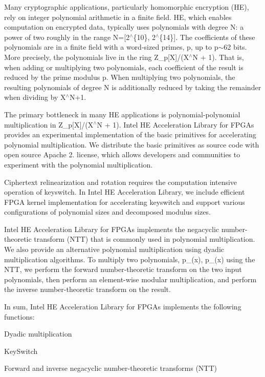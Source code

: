 Many cryptographic applications, particularly homomorphic encryption (H\-E), rely on integer polynomial arithmetic in a finite field. H\-E, which enables computation on encrypted data, typically uses polynomials with degree {\ttfamily N\-:} a power of two roughly in the range {\ttfamily N=\mbox{[}2$^\wedge$\{10\}, 2$^\wedge$\{14\}\mbox{]}}. The coefficients of these polynomials are in a finite field with a word-\/sized primes, {\ttfamily p}, up to {\ttfamily p}$\sim$62 bits. More precisely, the polynomials live in the ring {\ttfamily Z\-\_\-p\mbox{[}X\mbox{]}/(X$^\wedge$\-N + 1)}. That is, when adding or multiplying two polynomials, each coefficient of the result is reduced by the prime modulus {\ttfamily p}. When multiplying two polynomials, the resulting polynomials of degree {\-N} is additionally reduced by taking the remainder when dividing by {\ttfamily X$^\wedge$\-N+1}.

The primary bottleneck in many H\-E applications is polynomial-\/polynomial multiplication in {\ttfamily Z\-\_\-p\mbox{[}X\mbox{]}/(X$^\wedge$\-N + 1)}. Intel H\-E Acceleration Library for F\-P\-G\-As provides an experimental implementation of the basic primitives for accelerating polynomial multiplication. We distribute the basic primitives as source code with open source Apache 2. license, which allows developers and communities to experiment with the polynomial multiplication.

Ciphertext relinearization and rotation requires the computation intensive operation of keyswitch. In Intel H\-E Acceleration Library, we include efficient F\-P\-G\-A kernel implementation for accelerating keyswitch and support various configurations of polynomial sizes and decomposed modulus sizes.

Intel H\-E Acceleration Library for F\-P\-G\-As implements the negacyclic number-\/theoretic transform (N\-T\-T) that is commonly used in polynomial multiplication. We also provide an alternative polynomial multiplication using dyadic multiplication algorithms. To multiply two polynomials, {\ttfamily p\-\_(x), p\-\_(x)} using the N\-T\-T, we perform the forward number-\/theoretic transform on the two input polynomials, then perform an element-\/wise modular multiplication, and perform the inverse number-\/theoretic transform on the result.

In sum, Intel H\-E Acceleration Library for F\-P\-G\-As implements the following functions\-:
\begin{DoxyItemize}
\item Dyadic multiplication
\item Key\-Switch
\item Forward and inverse negacyclic number-\/theoretic transforms (N\-T\-T)
\end{DoxyItemize}

